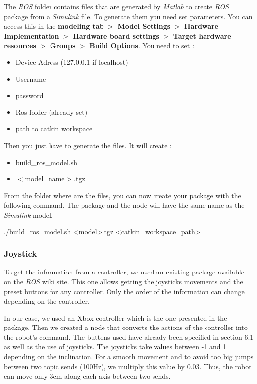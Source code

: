 \bigbreak
The \textit{ROS} folder contains files that are generated by \textit{Matlab} to create \textit{ROS} package from a \textit{Simulink} file. To generate them you need set parameters. You can access this in the \textbf{modeling tab} $\bg$ \textbf{Model Settings} $\bg$ \textbf{Hardware Implementation} $\bg$ \textbf{Hardware board settings} $\bg$ \textbf{Target hardware resources} $\bg$ \textbf{Groups} $\bg$ \textbf{Build Options}. You need to set :
\begin{itemize}[noitemsep]
    \item Device Adress (127.0.0.1 if localhost)
    \item Username
    \item password
    \item Ros folder (already set)
    \item path to catkin workspace
\end{itemize}

\bigbreak
Then you just have to generate the files. It will create :
\begin{multicols}{2}
    \begin{itemize}[noitemsep]
        \item build\_ros\_model.sh
        \item $\less$model\_name$\bg$.tgz
    \end{itemize}
\end{multicols}


\bigbreak
From the folder where are the files, you can now create your package with the following command. The package and the node will have the same name as the \textit{Simulink} model.
\begin{commandshell}
    ./build_ros_model.sh <model>.tgz <catkin_workspace_path>
\end{commandshell} 


\subsubsection{Joystick}

To get the information from a controller, we used an existing package available on the \textit{ROS} wiki site. This one allows getting the joysticks movements and the preset buttons for any controller. Only the order of the information can change depending on the controller. 

\bigbreak
In our case, we used an Xbox controller which is the one presented in the package. Then we created a node that converts the actions of the controller into the robot's command. The buttons used have already been specified in section 6.1 as well as the use of joysticks. The joysticks take values between -1 and 1 depending on the inclination. For a smooth movement and to avoid too big jumps between two topic sends (100Hz), we multiply this value by 0.03. Thus, the robot can move only 3cm along each axis between two sends.

